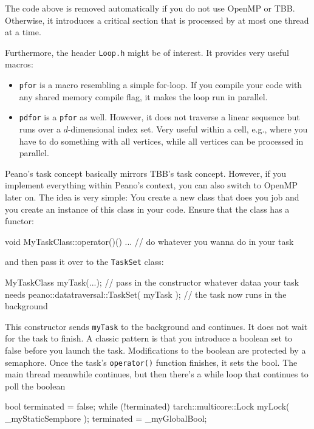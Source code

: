 \noindent
The code above is removed automatically if you do not use OpenMP or TBB.
Otherwise, it introduces a critical section that is processed by at most one
thread at a time.

Furthermore, the header \texttt{Loop.h} might be of interest. 
It provides very useful macros:
\begin{itemize}
  \item \texttt{pfor} is a macro resembling a simple for-loop. If you compile
  your code with any shared memory compile flag, it makes the loop run in
  parallel.
  \item \texttt{pdfor} is a \texttt{pfor} as well. However, it does not traverse
  a linear sequence but runs over a $d$-dimensional index set. Very useful
  within a cell, e.g., where you have to do something with all vertices, while
  all vertices can be processed in parallel.
\end{itemize}


Peano's task concept basically mirrors TBB's task concept. 
However, if you implement everything within Peano's context, you can also switch
to OpenMP later on.
The idea is very simple: You create a new class that does you job and
you create an instance of this class in your code.
Ensure that the class has a functor:

\begin{code}
  void MyTaskClass::operator()() {
   ...   // do whatever you wanna do in your task 
  } 
\end{code}

\noindent
and then pass it over to the \texttt{TaskSet} class:

\begin{code}
  MyTaskClass myTask(...); // pass in the constructor whatever dataa your task needs 
  peano::datatraversal::TaskSet( myTask ); // the task now runs in the background
\end{code}

\noindent
This constructor sends \texttt{myTask} to the background and continues. 
It does not wait for the task to finish.
A classic pattern is that you introduce a boolean set to false before you launch
the task.
Modifications to the boolean are protected by a semaphore.
Once the task's \texttt{operator()} function finishes, it sets the bool.
The main thread meanwhile continues, but then there's a while loop that
continues to poll the boolean

\begin{code}
  bool terminated = false;
  while (!terminated) {
    tarch::multicore::Lock myLock( _myStaticSemphore );
    terminated = _myGlobalBool;
  }
\end{code}

